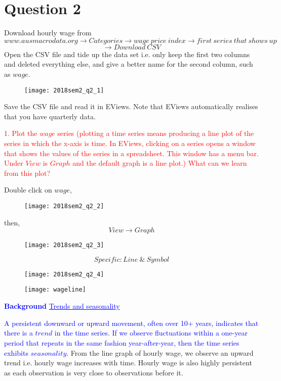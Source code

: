 \documentclass[12pt]{report}
\newenvironment{blueframed}[1][blue]
{\def\FrameCommand{\fboxsep=\FrameSep\fcolorbox{#1}{white}}%
\MakeFramed {\advance\hsize-\width \FrameRestore}}
{\endMakeFramed}
\begin{document}
\section*{Question 2}
\noindent Download hourly wage from $$www.ausmacrodata.org \to Categories \to wage\ price\ index \to first\ series\ that\ shows\ up$$ $$\to Download\ CSV$$ Open the CSV file and tide up the data set i.e. only keep the first two columns and deleted everything else, and give a better name for the second column, such as $wage$. 
\begin{figure}[H]
	\centerline{\texttt{[image: 2018sem2\_q2\_1]}}
\end{figure}
\vspace{-\baselineskip} \noindent Save the CSV file and read it in EViews. Note that EViews automatically realises that you have quarterly data.

\noindent \textcolor{red}{1. Plot the $wage$ series (plotting a time series means producing a line plot of the series in which the x-axis is time. In EViews, clicking on a series opens a window that shows the values of the series in a spreadsheet. This window has a menu bar. Under $View$ is $Graph$ and the default graph is a line plot.) What can we learn from this plot?}

\noindent Double click on $wage$,
\begin{figure}[H]
	\centerline{\texttt{[image: 2018sem2\_q2\_2]}}
\end{figure}
\vspace{-\baselineskip} \noindent then, $$View \to Graph$$
\begin{figure}[H]
	\centerline{\texttt{[image: 2018sem2\_q2\_3]}}
\end{figure}
\vspace{-\baselineskip} $$Specific: Line\ \&\ Symbol$$
\begin{figure}[H]
	\centerline{\texttt{[image: 2018sem2\_q2\_4]}}
\end{figure}
\vspace{-\baselineskip}
\begin{figure}[H]
	\centerline{\texttt{[image: wageline]}}
\end{figure}
\vspace{-\baselineskip} 
\justify
\begin{blueframed}
	\textcolor{blue}{\textbf{Background}}
	\vspace{-\baselineskip}
	\justify
	\textcolor{blue}{\underline{Trends and seasonality}}
	
	\noindent \textcolor{blue}
	{
		A persistent downward or upward movement, often over 10+ years, indicates that there is a $trend$ in the time series. If we observe fluctuations within a one-year period that repeats in the same fashion year-after-year, then the time series exhibits $seasonality$.
	}
\end{blueframed} \noindent From the line graph of hourly wage, we observe an upward trend i.e. hourly wage increases with time. Hourly wage is also highly persistent as each observation is very close to observations before it.
\end{document}

